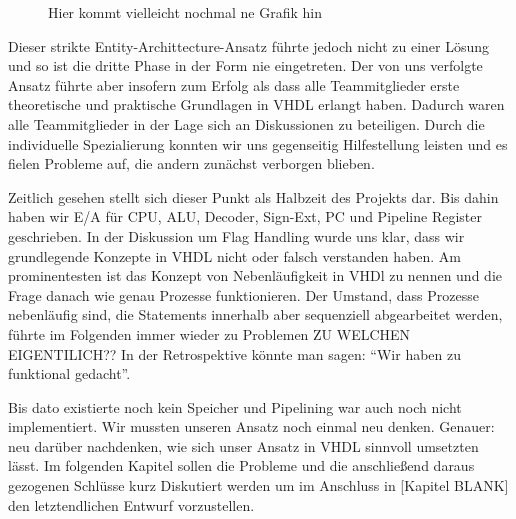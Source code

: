 \documentclass[paper=a4,fontsize=12pt,twocolumn]{scrreprt}
\begin{document}
\begin{figure}
    \centering
    \caption{Hier kommt vielleicht nochmal ne Grafik hin}
    \label{fig:my_label}
\end{figure}

%
%

Dieser strikte Entity-Archittecture-Ansatz führte jedoch nicht zu einer Lösung und so ist die dritte Phase in der Form nie eingetreten.
Der von uns verfolgte Ansatz führte aber insofern zum Erfolg als dass alle Teammitglieder erste theoretische und praktische Grundlagen in VHDL erlangt haben.
Dadurch waren alle Teammitglieder in der Lage sich an Diskussionen zu beteiligen.
Durch die individuelle Spezialierung konnten wir uns gegenseitig Hilfestellung leisten und es fielen Probleme auf, die andern zunächst verborgen blieben.

Zeitlich gesehen stellt sich dieser Punkt als Halbzeit des Projekts dar.
Bis dahin haben wir E/A für CPU, ALU, Decoder, Sign-Ext, PC und Pipeline Register geschrieben.
In der Diskussion um Flag Handling wurde uns klar, dass wir grundlegende Konzepte in VHDL nicht oder falsch verstanden haben.
Am prominentesten ist das Konzept von Nebenläufigkeit in VHDl zu nennen und die Frage danach wie genau Prozesse funktionieren.
Der Umstand, dass Prozesse nebenläufig sind, die Statements innerhalb aber sequenziell abgearbeitet werden, führte im Folgenden immer wieder zu Problemen {\color{red}ZU WELCHEN EIGENTILICH??}
In der Retrospektive könnte man sagen: \enquote{Wir haben zu funktional gedacht}.





Bis dato existierte noch kein Speicher und Pipelining war auch noch nicht implementiert.
Wir mussten unseren Ansatz noch einmal neu denken. Genauer: neu darüber nachdenken, wie sich unser Ansatz in VHDL sinnvoll umsetzten lässt.
Im folgenden Kapitel sollen die Probleme und die anschließend daraus gezogenen Schlüsse kurz Diskutiert werden um im Anschluss in [Kapitel BLANK] den letztendlichen Entwurf vorzustellen. 
\end{document}
